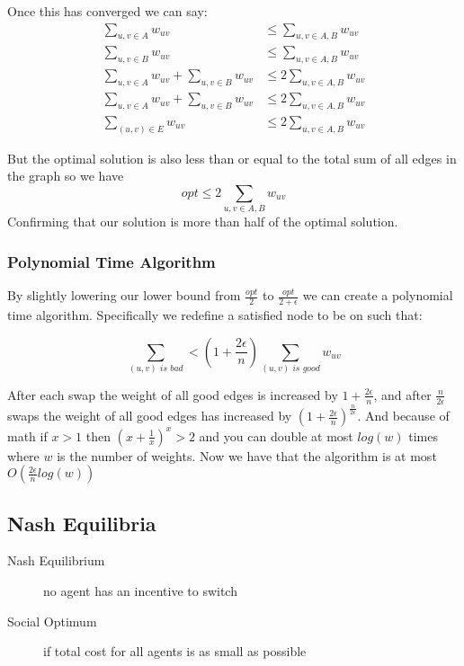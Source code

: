\documentclass[a4paper]{article}
\begin{document}
Once this has converged we can say:
\begin{align*}
	\sum\limits_{u,v\in A} w_{uv} &\leq \sum\limits_{u,v \in A,B} w_{uv}\\
	\sum\limits_{u,v\in B} w_{uv} &\leq \sum\limits_{u,v \in A,B} w_{uv}\\
	\sum\limits_{u,v\in A} w_{uv} +  \sum\limits_{u,v\in B} w_{uv}&\leq 2\sum\limits_{u,v \in A,B} w_{uv} \\
	\sum\limits_{u,v\in A} w_{uv} +  \sum\limits_{u,v\in B} w_{uv}&\leq 2\sum\limits_{u,v \in A,B} w_{uv} \\
	\sum\limits_{(u,v)\in E} w_{uv} &\leq 2\sum\limits_{u,v \in A,B} w_{uv} 
\end{align*}

But the optimal solution is also less than  or equal to the total sum of all edges in the graph so we have
$$opt \leq 2\sum\limits_{u,v \in A,B} w_{uv}$$
Confirming that our solution is more than half of the optimal solution.

\subsubsection{Polynomial Time Algorithm}
By slightly lowering our lower bound from $\frac{opt}{2}$ to $\frac{opt}{2+\epsilon}$ we can create a polynomial time algorithm. Specifically we redefine a satisfied node to be on such that:

$$\sum\limits_{(u,v)\textit{ is bad}} < (1 + \frac{2\epsilon}{n})\sum\limits_{(u,v)\textit{ is good}} w_{uv}$$

After each swap the weight of all good edges is increased by $1+\frac{2\epsilon}{n}$, and after $\frac{n}{2\epsilon}$ swaps the weight of all good edges has increased by $(1 + \frac{2\epsilon}{n})^{\frac{n}{2\epsilon}}$. And because of math if $x > 1$ then $(x + \frac{1}{x})^x > 2$ and you can double at most $log(w)$ times where $w$ is the number of weights. Now we have that the algorithm is at most $O(\frac{2\epsilon}{n}log(w))$

\subsection{Nash Equilibria}
\begin{description}
	\item[Nash Equilibrium] no agent has an incentive to switch
	\item[Social Optimum] if total cost for all agents is as small as possible
\end{description}
\end{document}

